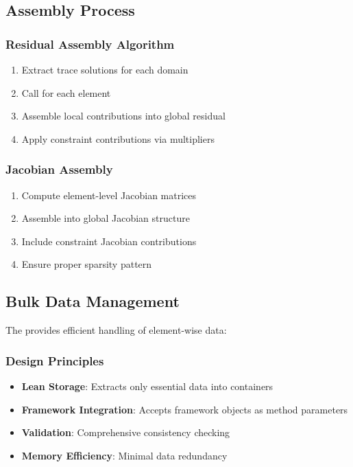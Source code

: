 \subsection{Assembly Process}

\subsubsection{Residual Assembly Algorithm}
\begin{enumerate}
    \item Extract trace solutions for each domain
    \item Call  for each element
    \item Assemble local contributions into global residual
    \item Apply constraint contributions via multipliers
\end{enumerate}

\subsubsection{Jacobian Assembly}
\begin{enumerate}
    \item Compute element-level Jacobian matrices
    \item Assemble into global Jacobian structure
    \item Include constraint Jacobian contributions
    \item Ensure proper sparsity pattern
\end{enumerate}

\subsection{Bulk Data Management}

The  provides efficient handling of element-wise data:

\subsubsection{Design Principles}
\begin{itemize}
    \item \textbf{Lean Storage}: Extracts only essential data into  containers
    \item \textbf{Framework Integration}: Accepts framework objects as method parameters
    \item \textbf{Validation}: Comprehensive consistency checking
    \item \textbf{Memory Efficiency}: Minimal data redundancy
\end{itemize}

